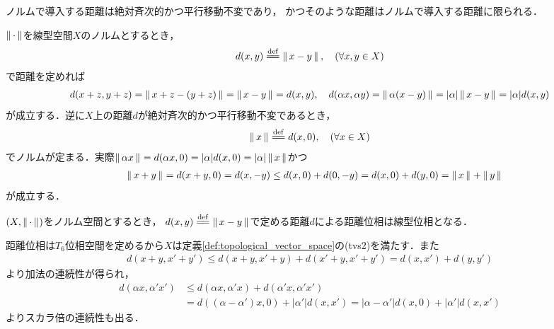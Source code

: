 	\begin{screen}
		\begin{thm}[絶対斉次的かつ平行移動不変な距離はノルムで導入する距離に限られる]
			ノルムで導入する距離は絶対斉次的かつ平行移動不変であり，
			かつそのような距離はノルムで導入する距離に限られる．
		\end{thm}
	\end{screen}
	
	\begin{prf}
		$\left\|\, \cdot\, \right\|_{}$を線型空間$X$のノルムとするとき，
		\begin{align}
			d(x,y) \defeq \Norm{x-y}{}, \quad (\forall x,y \in X)
		\end{align}
		で距離を定めれば
		\begin{align}
			d(x+z,y+z) = \left\|\, x+z-(y+z)\, \right\|_{} = \left\|\, x-y\, \right\|_{} = d(x,y),
			\quad d(\alpha x, \alpha y)
			= \left\|\, \alpha (x-y)\, \right\|_{} = |\alpha|\left\|\, x-y\, \right\|_{} = |\alpha|d(x,y)
		\end{align}
		が成立する．逆に$X$上の距離$d$が絶対斉次的かつ平行移動不変であるとき，
		\begin{align}
			\Norm{x}{} \defeq d(x,0),\quad (\forall x \in X)
		\end{align}
		でノルムが定まる．実際$\left\|\, \alpha x\, \right\|_{} = d(\alpha x,0) 
		= |\alpha|d(x,0) = |\alpha|\left\|\, x\, \right\|_{}$かつ
		\begin{align}
			\quad \left\|\, x+y\, \right\|_{} = d(x+y,0) = d(x,-y) 
			\leq d(x,0) + d(0,-y) = d(x,0) + d(y,0) = \left\|\, x\, \right\|_{} + \left\|\, y\, \right\|_{}
		\end{align}
		が成立する．
		\QED
	\end{prf}
	
	\begin{screen}
		\begin{thm}[ノルムで導入する距離位相は線型位相]
			$(X,\left\|\, \cdot\, \right\|_{})$をノルム空間とするとき，
			$d(x,y) \defeq \Norm{x-y}{}$で定める距離$d$による距離位相は線型位相となる．
		\end{thm}
	\end{screen}
	
	\begin{prf}
		距離位相は$T_6$位相空間を定めるから$X$は定義\ref{def:topological_vector_space}の(tvs2)を満たす．また
		\begin{align}
			d(x+y,x'+y') \leq d(x+y,x'+y) + d(x'+y,x'+y') = d(x,x') + d(y,y')
		\end{align}
		より加法の連続性が得られ，
		\begin{align}
			d(\alpha x, \alpha'x') &\leq d(\alpha x, \alpha'x) + d(\alpha'x,\alpha'x') \\
			&= d((\alpha - \alpha') x, 0) + |\alpha'|d(x,x')
			= |\alpha-\alpha'|d(x,0) + |\alpha'|d(x,x')
		\end{align}
		よりスカラ倍の連続性も出る．
		\QED
	\end{prf}
	
